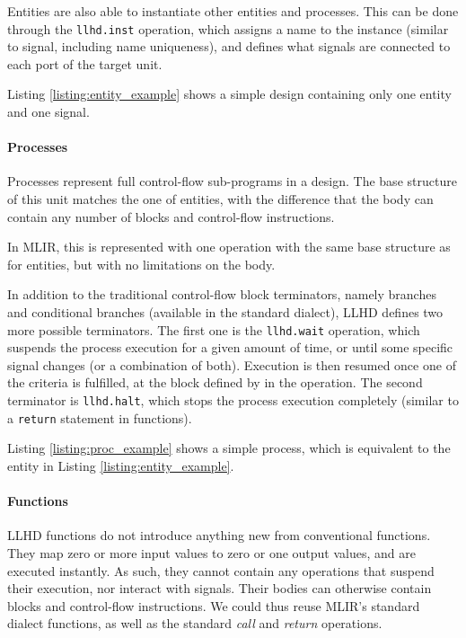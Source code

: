 Entities are also able to instantiate other entities and processes. This can be done through the \texttt{llhd.inst} operation, which assigns a name to the instance (similar to signal, including name uniqueness), and defines what signals are connected to each port of the target unit.

Listing \ref{listing:entity_example} shows a simple design containing only one entity and one signal.


\paragraph{Processes}
Processes represent full control-flow sub-programs in a design. The base structure of this unit matches the one of entities, with the difference that the body can contain any number of blocks and control-flow instructions.

In MLIR, this is represented with one operation with the same base structure as for entities, but with no limitations on the body.

In addition to the traditional control-flow block terminators, namely branches and conditional branches (available in the standard dialect), LLHD defines two more possible terminators. The first one is the \texttt{llhd.wait} operation, which suspends the process execution for a given amount of time, or until some specific signal changes (or a combination of both). Execution is then resumed once one of the criteria is fulfilled, at the block defined by in the operation. The second terminator is \texttt{llhd.halt}, which stops the process execution completely (similar to a \texttt{return} statement in functions).

Listing \ref{listing:proc_example} shows a simple process, which is equivalent to the entity in Listing \ref{listing:entity_example}.


\paragraph{Functions}
LLHD functions do not introduce anything new from conventional functions. They map zero or more input values to zero or one output values, and are executed instantly. As such, they cannot contain any operations that suspend their execution, nor interact with signals. Their bodies can otherwise contain blocks and control-flow instructions. We could thus reuse MLIR's standard dialect functions, as well as the standard \textit{call} and \textit{return} operations.


